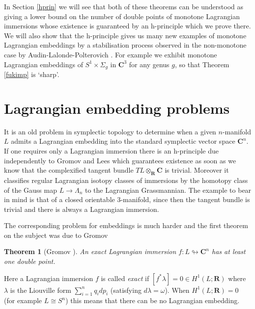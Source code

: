 \documentclass{amsart}
\newcommand{\CC}{\mathbf{C}}
\newcommand{\RR}{\mathbf{R}}
\newtheorem{thm}{Theorem}
\begin{document}
In Section \ref{hprin} we will see that both of these theorems can be understood as giving a lower bound on the number of double points of monotone Lagrangian immersions whose existence is guaranteed by an h-principle which we prove there. We will also show that the h-principle gives us many new examples of monotone Lagrangian embeddings by a stabilisation process observed in the non-monotone case by Audin-Lalonde-Polterovich \cite{ALP}. For example we exhibit monotone Lagrangian embeddings of $S^1\times \Sigma_g$ in $\CC^3$ for any genus $g$, so that Theorem \ref{fukimp} is `sharp'.

\section{Lagrangian embedding problems}
It is an old problem in symplectic topology to determine when a given $n$-manifold $L$ admits a Lagrangian embedding into the standard symplectic vector space $\CC^n$. If one requires only a Lagrangian immersion there is an h-principle due independently to Gromov and Lees \cite{Lees} which guarantees existence as soon as we know that the complexified tangent bundle $TL\otimes_{\RR}\CC$ is trivial. Moreover it classifies regular Lagrangian isotopy classes of immersions by the homotopy class of the Gauss map $L\rightarrow\Lambda_n$ to the Lagrangian Grassmannian. The example to bear in mind is that of a closed orientable 3-manifold, since then the tangent bundle is trivial and there is always a Lagrangian immersion.

The corresponding problem for embeddings is much harder and the first theorem on the subject was due to Gromov
\begin{thm}[Gromov \cite{Gro}]
An exact Lagrangian immersion $f:L\looparrowright\CC^n$ has at least one double point.
\end{thm}
Here a Lagrangian immersion $f$ is called \emph{exact} if $[f^*\lambda]=0\in H^1(L;\RR)$ where $\lambda$ is the Liouville form $\sum_{i=1}^nq_idp_i$ (satisfying $d\lambda=\omega$). When $H^1(L;\RR)=0$ (for example $L\cong S^n$) this means that there can be no Lagrangian embedding.
\end{document}
